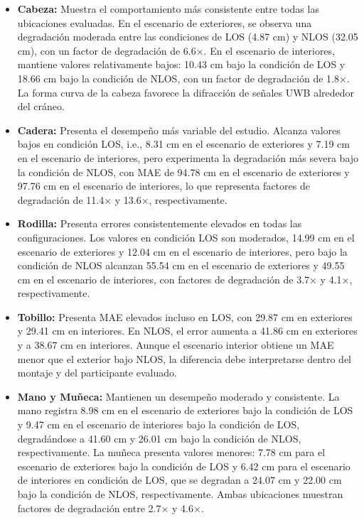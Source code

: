 \begin{itemize}
\item \textbf{Cabeza:} Muestra el comportamiento más consistente entre todas las ubicaciones evaluadas. En el escenario de exteriores, se observa una degradación moderada entre las condiciones de LOS (4.87 cm) y NLOS (32.05 cm), con un factor de degradación de 6.6×. En el escenario de interiores, mantiene valores relativamente bajos: 10.43 cm bajo la condición de LOS y 18.66 cm bajo la condición de NLOS, con un factor de degradación de 1.8×. La forma curva de la cabeza favorece la difracción de señales UWB alrededor del cráneo.

\item \textbf{Cadera:} Presenta el desempeño más variable del estudio. Alcanza valores bajos en condición LOS, i.e., 8.31 cm en el escenario de exteriores y 7.19 cm en el escenario de interiores, pero experimenta la degradación más severa bajo la condición de NLOS, con MAE de 94.78 cm en el escenario de exteriores y 97.76 cm en el escenario de interiores, lo que representa factores de degradación de 11.4× y 13.6×, respectivamente.

\item \textbf{Rodilla:} Presenta errores consistentemente elevados en todas las configuraciones. Los valores en condición LOS son moderados, 14.99 cm en el escenario de exteriores y 12.04 cm en el escenario de interiores, pero bajo la condición de NLOS alcanzan 55.54 cm en el escenario de exteriores y 49.55 cm en el escenario de interiores, con factores de degradación de 3.7× y 4.1×, respectivamente.

\item \textbf{Tobillo:} Presenta MAE elevados incluso en LOS, con 29.87 cm en exteriores y 29.41 cm en interiores. En NLOS, el error aumenta a 41.86 cm en exteriores y a 38.67 cm en interiores. Aunque el escenario interior obtiene un MAE menor que el exterior bajo NLOS, la diferencia debe interpretarse dentro del montaje y del participante evaluado.

\item \textbf{Mano y Muñeca:} Mantienen un desempeño moderado y consistente. La mano registra 8.98 cm en el escenario de exteriores bajo la condición de LOS y 9.47 cm en el escenario de interiores bajo la condición de LOS, degradándose a 41.60 cm y 26.01 cm bajo la condición de NLOS, respectivamente. La muñeca presenta valores menores: 7.78 cm para el escenario de exteriores bajo la condición de LOS y 6.42 cm para el escenario de interiores en condición de LOS, que se degradan a 24.07 cm y 22.00 cm bajo la condición de NLOS, respectivamente. Ambas ubicaciones muestran factores de degradación entre 2.7× y 4.6×.
\end{itemize}


